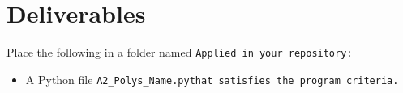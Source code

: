 \documentclass{article}
\newcommand\foldername{\tt{Applied} }
\newcommand\filename{\tt{A2\_Polys\_Name.py}\;\;}
\begin{document}
\section*{Deliverables}
	
	
	Place the following in a folder named \foldername in your repository:
	\begin{itemize}
		\item A Python file \filename  that satisfies the program criteria.
	\end{itemize}

	
\end{document}
